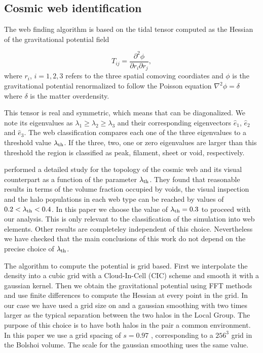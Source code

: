 \documentclass{emulateapj}
\newcommand{\manuscript}{paper }
\newcommand{\hMpc}{{\ifmmode{h^{-1}{\rm Mpc}}\else{$h^{-1}$Mpc }\fi}}
\begin{document}
\subsection{Cosmic web identification}
The web finding algorithm is based on the tidal tensor computed as the
Hessian of the  gravitational potential field

\begin{equation}
T_{ij} = \frac{\partial^2 \phi}{\partial r_i \partial r_j}, 
\end{equation}
%
where $r_{i}$, $i=1,2,3$ refers to the three spatial comoving
coordiates and $\phi$ is the gravitational potential renormalized to
follow the Poisson equation $\nabla^2\phi=\delta$ where
$\delta$ is the matter overdensity.  

This tensor is real and symmetric, which means that can be
diagonalized. 
We note its eigenvalues as $\lambda_1\geq \lambda_2\geq
\lambda_3$ and their corresponding eigenvectors $\hat{e}_1$,
$\hat{e}_2$ and $\hat{e}_3$. 
The web classification compares each one
of the three eigenvalues to a threshold value $\lambda_{\rm th}$. 
If
the three, two, one or zero eigenvalues are larger than this threshold
the region is classified as peak, filament, sheet or void,
respectively.  

\cite{Tweb} performed a detailed study for the topology of the
cosmic web and its visual counterpart as a function of the parameter
$\lambda_{\rm th}$. 
They found that reasonable results in terms of the
volume fraction occupied by voids, the visual inspection and the halo
populations in each web type can be reached by values of $0.2<\lambda_{\rm
th}<0.4$. 
In this \manuscript we choose the value of $\lambda_{\rm
  th}=0.3$ to proceed with our analysis. 
This is only relevant to the classification of the simulation into web
elements. Other results are completeley independent of this
choice. Nevertheless we have checked that the main conclusions of this
work do not depend on the precise choice of $\lambda_{\rm th}$.


The algorithm to compute the potential is grid based. 
First we interpolate the density into a cubic grid with a
Cloud-In-Cell (CIC) scheme and smooth it with a gaussian kernel. 
Then we obtain the gravitational potential using FFT methods and use finite differences
to compute the Hessian at every point in the grid. 
In our case we have used a grid size on and a gaussian smoothing with
two times larger as the typical separation between the two halos in the Local Group. 
The purpose of this choice is to have both halos in the pair a common
environment. 
In this \manuscript we use a grid spacing of $s=0.97$ \hMpc,
corresponding to a $256^3$ grid in the Bolshoi volume. 
The scale for the gaussian smoothing uses the same value.
\end{document}
